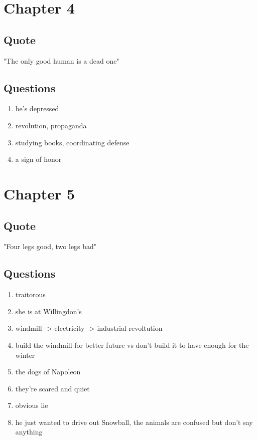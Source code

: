 \documentclass[8pt, letterpaper]{article}
\begin{document}
\section{Chapter 4}

\subsection{Quote}
"The only good human is a dead one"

\subsection{Questions}
\begin{enumerate}
  \item he's depressed
  \item revolution, propaganda
  \item studying books, coordinating defense
  \item a sign of honor
\end{enumerate}

\section{Chapter 5}

\subsection{Quote}
"Four legs good, two legs bad"

\subsection{Questions}
\begin{enumerate}
  \item traitorous
  \item she is at Willingdon's
  \item windmill -> electricity -> industrial revoltution
  \item build the windmill for better future vs don't build it to have enough for the winter
  \item the dogs of Napoleon
  \item they're scared and quiet
  \item obvious lie
  \item he just wanted to drive out Snowball, the animals are confused but don't say anything
\end{enumerate}
\end{document}

